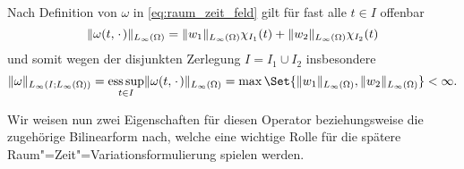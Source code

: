 \documentclass[../main.tex]{subfiles}
\begin{document}
\begin{Bemerkung}
\label{bemerkung:raum_zeit_feld_norm_zeitunabhaengig}
    Nach Definition von $\omega$ in \cref{eq:raum_zeit_feld} gilt für fast alle $t \in I$ offenbar
    \begin{equation}
        \lVert\omega(t, {\mkern2mu\cdot\mkern2mu})\rVert_{L_{\infty}(\Omega)} = \lVert w_{1}\rVert_{L_{\infty}(\Omega)} \chi_{I_{1}}(t) + \lVert w_{2}\rVert_{L_{\infty}(\Omega)} \chi_{I_{2}}(t)
    \end{equation}
    und somit wegen der disjunkten Zerlegung $I = I_{1} \cup I_{2}$ insbesondere
    \begin{equation}
        \norm{\omega}_{L_{\infty}(I; L_{\infty}(\Omega))} = \esssup_{t \in I} \norm{\omega(t, \blank)}_{L_{\infty}(\Omega)} = \max\Set{ \norm{w_{1}}_{L_{\infty}(\Omega)}, \norm{w_{2}}_{L_{\infty}(\Omega)} } < \infty.
    \end{equation}
\end{Bemerkung}

Wir weisen nun zwei Eigenschaften für diesen Operator beziehungsweise die zugehörige Bilinearform nach, welche eine wichtige Rolle für die spätere Raum"=Zeit"=Variationsformulierung spielen werden.
\end{document}
